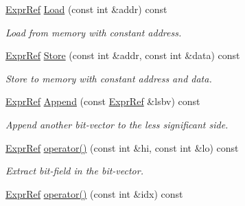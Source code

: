 \begin{DoxyCompactItemize}
\mbox{\label{classilang_1_1_expr_ref_a948e03a1f24fc7bb7afc9ec4e698e2cd}} 
\mbox{\hyperlink{classilang_1_1_expr_ref}{Expr\+Ref}} \mbox{\hyperlink{classilang_1_1_expr_ref_a948e03a1f24fc7bb7afc9ec4e698e2cd}{Load}} (const int \&addr) const
\begin{DoxyCompactList}\small\item\em Load from memory with constant address. \end{DoxyCompactList}\item 
\mbox{\label{classilang_1_1_expr_ref_a0b147afffd1c0ba885951472b0697430}} 
\mbox{\hyperlink{classilang_1_1_expr_ref}{Expr\+Ref}} \mbox{\hyperlink{classilang_1_1_expr_ref_a0b147afffd1c0ba885951472b0697430}{Store}} (const int \&addr, const int \&data) const
\begin{DoxyCompactList}\small\item\em Store to memory with constant address and data. \end{DoxyCompactList}\item 
\mbox{\label{classilang_1_1_expr_ref_af4a6672462b5d6a69757ef3041e22182}} 
\mbox{\hyperlink{classilang_1_1_expr_ref}{Expr\+Ref}} \mbox{\hyperlink{classilang_1_1_expr_ref_af4a6672462b5d6a69757ef3041e22182}{Append}} (const \mbox{\hyperlink{classilang_1_1_expr_ref}{Expr\+Ref}} \&lsbv) const
\begin{DoxyCompactList}\small\item\em Append another bit-\/vector to the less significant side. \end{DoxyCompactList}\item 
\mbox{\label{classilang_1_1_expr_ref_a59c891357fc6828e68bb4c56946bd11d}} 
\mbox{\hyperlink{classilang_1_1_expr_ref}{Expr\+Ref}} \mbox{\hyperlink{classilang_1_1_expr_ref_a59c891357fc6828e68bb4c56946bd11d}{operator()}} (const int \&hi, const int \&lo) const
\begin{DoxyCompactList}\small\item\em Extract bit-\/field in the bit-\/vector. \end{DoxyCompactList}\item 
\mbox{\label{classilang_1_1_expr_ref_a82fcbe55f06048d5cdd04e32700176e6}} 
\mbox{\hyperlink{classilang_1_1_expr_ref}{Expr\+Ref}} \mbox{\hyperlink{classilang_1_1_expr_ref_a82fcbe55f06048d5cdd04e32700176e6}{operator()}} (const int \&idx) const

\end{DoxyCompactItemize}
